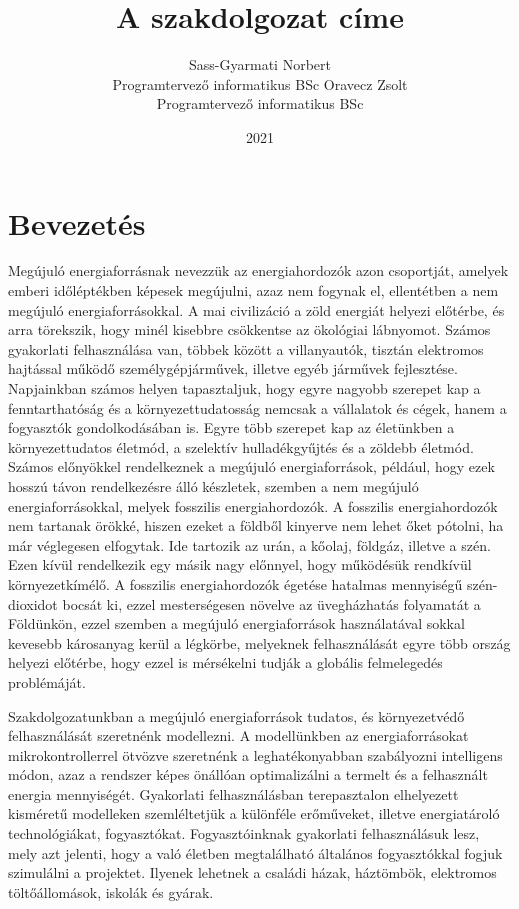 \documentclass[
]{thesis-ekf}
\theoremstyle{definition}
\theoremstyle{remark}
\begin{document}
\title{A szakdolgozat címe}

\author{ Sass-Gyarmati Norbert\\Programtervező informatikus BSc
	\collaborator
	Oravecz Zsolt\\Programtervező informatikus BSc}
\date{2021}
\maketitle
\tableofcontents

\chapter*{Bevezetés}
Megújuló energiaforrásnak nevezzük az energiahordozók azon csoportját, amelyek emberi időléptékben képesek megújulni, azaz nem fogynak el, ellentétben a nem megújuló energiaforrásokkal.  A mai civilizáció a zöld energiát helyezi előtérbe, és arra törekszik, hogy minél kisebbre csökkentse az ökológiai lábnyomot. Számos gyakorlati felhasználása van, többek között a villanyautók, tisztán elektromos hajtással működő személygépjárművek, illetve egyéb járművek fejlesztése. Napjainkban számos helyen tapasztaljuk, hogy egyre nagyobb szerepet kap a fenntarthatóság és a környezettudatosság nemcsak a vállalatok és cégek, hanem a fogyasztók gondolkodásában is. Egyre több szerepet kap az életünkben a környezettudatos életmód, a szelektív hulladékgyűjtés és a zöldebb életmód. Számos előnyökkel rendelkeznek a megújuló energiaforrások, például, hogy ezek hosszú távon rendelkezésre álló készletek, szemben a nem megújuló energiaforrásokkal, melyek fosszilis energiahordozók. A fosszilis energiahordozók nem tartanak örökké, hiszen ezeket a földből kinyerve nem lehet őket pótolni, ha már véglegesen elfogytak. Ide tartozik az urán, a kőolaj, földgáz, illetve a szén. Ezen kívül rendelkezik egy másik nagy előnnyel, hogy működésük rendkívül környezetkímélő. A fosszilis energiahordozók égetése hatalmas mennyiségű szén-dioxidot bocsát ki, ezzel mesterségesen növelve az üvegházhatás folyamatát a Földünkön, ezzel szemben a megújuló energiaforrások használatával sokkal kevesebb károsanyag kerül a légkörbe, melyeknek felhasználását egyre több ország helyezi előtérbe, hogy ezzel is mérsékelni tudják a globális felmelegedés problémáját.
\par Szakdolgozatunkban  a megújuló energiaforrások tudatos, és környezetvédő felhasználását szeretnénk modellezni.  A modellünkben az energiaforrásokat mikrokontrollerrel 
ötvözve szeretnénk a leghatékonyabban szabályozni intelligens módon, azaz a rendszer képes önállóan optimalizálni a termelt és a felhasznált energia mennyiségét. Gyakorlati felhasználásban terepasztalon elhelyezett kisméretű modelleken szemléltetjük a különféle erőműveket, illetve energiatároló technológiákat, fogyasztókat. Fogyasztóinknak gyakorlati felhasználásuk lesz, mely azt jelenti, hogy a való életben megtalálható általános fogyasztókkal fogjuk szimulálni a projektet. Ilyenek lehetnek a családi házak, háztömbök, elektromos töltőállomások, iskolák és gyárak.
\end{document}
